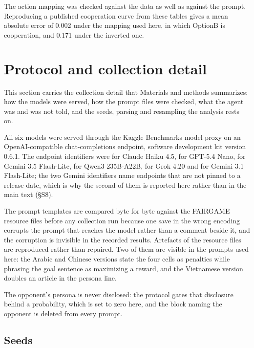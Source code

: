 \documentclass[11pt,a4paper]{article}
\begin{document}
The action mapping was checked against the data as well as against the prompt.
Reproducing a published cooperation curve from these tables gives a mean
absolute error of 0.002 under the mapping used here, in which OptionB is
cooperation, and 0.171 under the inverted one.

\section{Protocol and collection detail}

This section carries the collection detail that Materials and methods
summarizes: how the models were served, how the prompt files were checked, what
the agent was and was not told, and the seeds, parsing and resampling the
analysis rests on.

All six models were served through the Kaggle Benchmarks model proxy on an
OpenAI-compatible chat-completions endpoint, software development kit version
0.6.1. The endpoint identifiers were  for Claude
Haiku 4.5,  for GPT-5.4 Nano,
 for Gemini 3.5 Flash-Lite,
 for Qwen3 235B-A22B,
 for Grok 4.20 and
 for Gemini 3.1 Flash-Lite; the two Gemini
identifiers name endpoints that are not pinned to a release date, which is why
the second of them is reported here rather than in the main text (\S S8).

The prompt templates are compared byte for byte against the FAIRGAME resource
files before any collection run because one save in the wrong encoding corrupts
the prompt that reaches the model rather than a comment beside it, and the
corruption is invisible in the recorded results. Artefacts of the resource files
are reproduced rather than repaired. Two of them are visible in the prompts used
here: the Arabic and Chinese versions state the four cells as penalties while
phrasing the goal sentence as maximizing a reward, and the Vietnamese version
doubles an article in the persona line.

The opponent's persona is never disclosed: the protocol gates that disclosure
behind a probability, which is set to zero here, and the block naming the
opponent is deleted from every prompt.

\subsection{Seeds}
\end{document}
